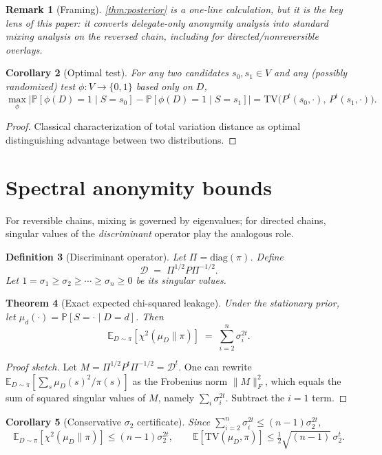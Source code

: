 \documentclass[11pt]{article}
\newtheorem{theorem}{Theorem}[section]
\newtheorem{corollary}[theorem]{Corollary}
\newtheorem{definition}[theorem]{Definition}
\newtheorem{remark}[theorem]{Remark}
\newcommand{\TV}{\mathrm{TV}}
\newcommand{\E}{\mathbb{E}}
\newcommand{\Prb}{\mathbb{P}}
\newcommand{\cD}{\mathcal{D}}
\newcommand{\PiM}{\Pi}
\begin{document}
\begin{remark}[Framing]\label{rem:lens}
\cref{thm:posterior} is a one-line calculation, but it is the key \emph{lens} of
this paper: it converts delegate-only anonymity analysis into standard mixing
analysis on the reversed chain, including for directed/nonreversible overlays.
\end{remark}

\begin{corollary}[Optimal test]\label{cor:opt-test}
For any two candidates $s_0,s_1\in V$ and any (possibly randomized) test
$\phi:V\to\{0,1\}$ based only on $D$,
\[
\max_{\phi}\Big|\Prb[\phi(D)=1\mid S=s_0]-\Prb[\phi(D)=1\mid S=s_1]\Big|
= \TV\!\big(P^t(s_0,\cdot),\,P^t(s_1,\cdot)\big).
\]
\end{corollary}
\begin{proof}
Classical characterization of total variation distance as optimal distinguishing
advantage between two distributions.
\end{proof}

\section{Spectral anonymity bounds}\label{sec:spectral}
For reversible chains, mixing is governed by eigenvalues; for directed chains,
singular values of the \emph{discriminant} operator play the analogous role.

\begin{definition}[Discriminant operator]\label{def:disc}
Let $\PiM=\mathrm{diag}(\pi)$. Define
\[
\cD \;=\; \PiM^{1/2} P \PiM^{-1/2}.
\]
Let $1=\sigma_1\ge\sigma_2\ge\cdots\ge\sigma_n\ge 0$ be its singular values.
\end{definition}

\begin{theorem}[Exact expected chi-squared leakage]\label{thm:chi2-exact}
Under the stationary prior, let $\mu_d(\cdot)=\Prb[S=\cdot\mid D=d]$. Then
\[
\E_{D\sim \pi}\!\left[\chi^2(\mu_D\|\pi)\right] \;=\;
\sum_{i=2}^n \sigma_i^{2t}.
\]
\end{theorem}
\begin{proof}[Proof sketch]
Let $M=\PiM^{1/2}P^t\PiM^{-1/2}=\cD^t$. One can rewrite
$\E_{D\sim\pi}\left[\sum_s \mu_D(s)^2/\pi(s)\right]$ as the Frobenius norm
$\|M\|_F^2$, which equals the sum of squared singular values of $M$, namely
$\sum_i \sigma_i^{2t}$. Subtract the $i=1$ term.
\end{proof}

\begin{corollary}[Conservative $\sigma_2$ certificate]\label{cor:sigma2}
Since $\sum_{i=2}^n \sigma_i^{2t}\le (n-1)\sigma_2^{2t}$,
\[
\E_{D\sim\pi}\!\left[\chi^2(\mu_D\|\pi)\right]\le (n-1)\sigma_2^{2t},
\qquad
\E[\TV(\mu_D,\pi)] \le \tfrac12\sqrt{(n-1)}\,\sigma_2^{t}.
\]
\end{corollary}
\end{document}
